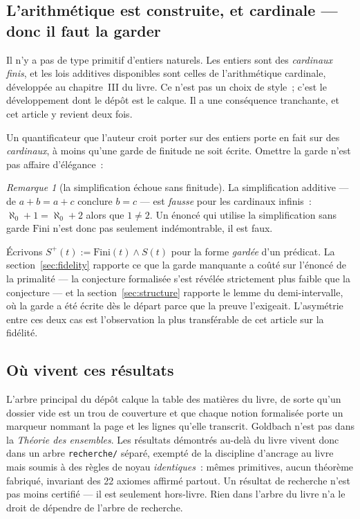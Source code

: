 \documentclass[11pt]{article}
\theoremstyle{remark}\newtheorem{remarque}{Remarque}
\begin{document}
\subsection{L'arithmétique est construite, et cardinale --- donc il faut la garder}

Il n'y a pas de type primitif d'entiers naturels. Les entiers sont des \emph{cardinaux
finis}, et les lois additives disponibles sont celles de l'arithmétique cardinale,
développée au chapitre~III du livre. Ce n'est pas un choix de style~; c'est le
développement dont le dépôt est le calque. Il a une conséquence tranchante, et cet
article y revient deux fois.

Un quantificateur que l'auteur croit porter sur des entiers porte en fait sur des
\emph{cardinaux}, à moins qu'une garde de finitude ne soit écrite. Omettre la garde n'est
pas affaire d'élégance~:

\begin{remarque}[la simplification échoue sans finitude]\label{rem:cancel}
La simplification additive --- de $a + b = a + c$ conclure $b = c$ --- est \emph{fausse}
pour les cardinaux infinis~: $\aleph_0 + 1 = \aleph_0 + 2$ alors que $1 \neq 2$. Un
énoncé qui utilise la simplification sans garde $\mathrm{Fini}$ n'est donc pas seulement
indémontrable, il est faux.
\end{remarque}

Écrivons $S^{+}(t) := \mathrm{Fini}(t) \wedge S(t)$ pour la forme \emph{gardée} d'un
prédicat. La section~\ref{sec:fidelity} rapporte ce que la garde manquante a coûté sur
l'énoncé de la primalité --- la conjecture formalisée s'est révélée strictement plus
faible que la conjecture --- et la section~\ref{sec:structure} rapporte le lemme du
demi-intervalle, où la garde a été écrite dès le départ parce que la preuve l'exigeait.
L'asymétrie entre ces deux cas est l'observation la plus transférable de cet article sur
la fidélité.

\subsection{Où vivent ces résultats}

L'arbre principal du dépôt calque la table des matières du livre, de sorte qu'un dossier
vide est un trou de couverture et que chaque notion formalisée porte un marqueur nommant
la page et les lignes qu'elle transcrit. Goldbach n'est pas dans la \emph{Théorie des
ensembles}. Les résultats démontrés au-delà du livre vivent donc dans un arbre
\texttt{recherche/} séparé, exempté de la discipline d'ancrage au livre mais soumis à des
règles de noyau \emph{identiques}~: mêmes primitives, aucun théorème fabriqué, invariant
des 22 axiomes affirmé partout. Un résultat de recherche n'est pas moins certifié --- il
est seulement hors-livre. Rien dans l'arbre du livre n'a le droit de dépendre de l'arbre
de recherche.
\end{document}
